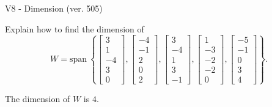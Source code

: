 \begin{exercise}
  \begin{exerciseTitle}V8 - Dimension (ver. 505)\end{exerciseTitle}
  \begin{exerciseStatement}
    Explain how to find the dimension of 
\[W=\mathrm{span}\ \left\{\left[\begin{array}{r}
3 \\
1 \\
-4 \\
3 \\
0
\end{array}\right] , \left[\begin{array}{r}
-4 \\
-1 \\
2 \\
0 \\
2
\end{array}\right] , \left[\begin{array}{r}
3 \\
-4 \\
1 \\
3 \\
-1
\end{array}\right] , \left[\begin{array}{r}
1 \\
-3 \\
-2 \\
-2 \\
0
\end{array}\right] , \left[\begin{array}{r}
-5 \\
-1 \\
0 \\
3 \\
4
\end{array}\right]\right\}.\]



  \end{exerciseStatement}
  \begin{exerciseAnswer}
   The dimension of \(W\) is  \(4\).
  


  \end{exerciseAnswer}
\end{exercise}